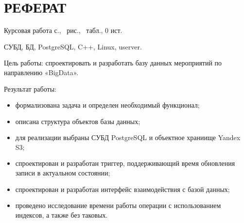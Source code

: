 \section*{РЕФЕРАТ}

Курсовая работа \pageref{LastPage} с., \totalfigures\ рис., \totaltables\ табл., 0 ист.

СУБД, БД, PostgreSQL, C++, Linux, userver.

Цель работы: спроектировать и разработать базу данных мероприятий по направлению «BigData».

Результат работы: 
\begin{itemize}[label=---]
	\item формализована задача и определен необходимый функционал;
	\item описана структура объектов базы данных;
	\item для реализации выбраны СУБД PostgreSQL и объектное храниище Yandex S3;
	\item спроектирован и разработан триггер, поддерживающий время обновления записи в актуальном состоянии;
	\item спроектирован и разработан интерфейс взаимодействия с базой данных;
	\item проведено исследование времени работы операции с использованием индексов, а также без таковых.
\end{itemize}

\pagebreak

